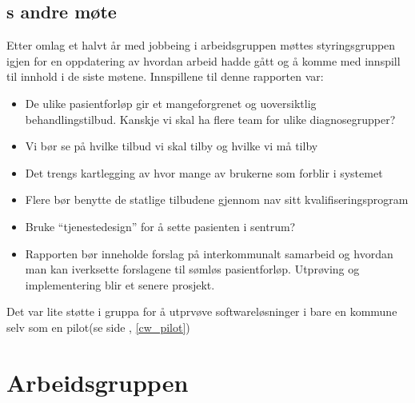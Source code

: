 \documentclass[11pt]{report} %
\begin{document}
                  \subsection{s andre møte}\label{sec:stygr_2}
                    Etter omlag et halvt år med jobbeing i arbeidsgruppen møttes styringsgruppen igjen \cite{strgr_mref13-2} for en oppdatering av hvordan arbeid hadde gått og å komme med innspill til innhold i de siste møtene. Innspillene til denne rapporten var:
                    \begin{itemize}
                    \item De ulike pasientforløp gir et mangeforgrenet og uoversiktlig behandlingstilbud. Kanskje vi skal ha flere team for ulike diagnosegrupper?\\
                    \item Vi bør se på hvilke tilbud vi skal tilby og hvilke vi må tilby\\
                    \item Det trengs kartlegging av hvor mange av brukerne som forblir i systemet\\
                    \item Flere bør benytte de statlige tilbudene gjennom nav sitt kvalifiseringsprogram\\
                    \item Bruke “tjenestedesign” for å sette pasienten i sentrum?\\
                    \item Rapporten bør inneholde forslag på interkommunalt samarbeid og hvordan man kan iverksette forslagene til sømløs pasientforløp. Utprøving og implementering blir et senere prosjekt.\\
                    \end{itemize}
                    Det var lite støtte i gruppa for å utprvøve softwareløsninger i bare en kommune selv som en pilot(se side \pageref{cw_pilot}, \ref{cw_pilot})
                \section{Arbeidsgruppen}\label{sec:m_agr}
\end{document}
